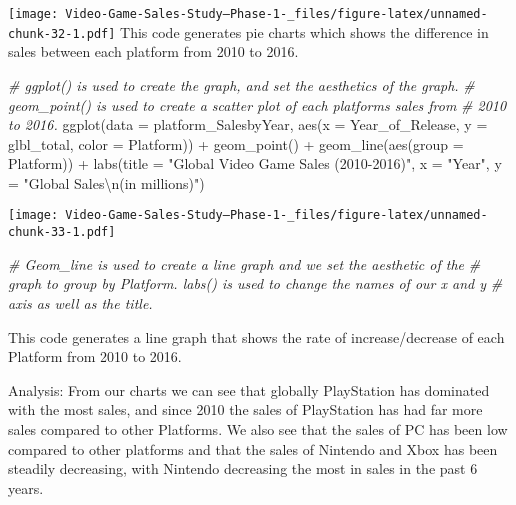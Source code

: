 \documentclass[
]{article}
\newenvironment{Shaded}{\begin{snugshade}}{\end{snugshade}}
\newcommand{\AttributeTok}[1]{\textcolor[rgb]{0.77,0.63,0.00}{#1}}
\newcommand{\CommentTok}[1]{\textcolor[rgb]{0.56,0.35,0.01}{\textit{#1}}}
\newcommand{\FunctionTok}[1]{\textcolor[rgb]{0.00,0.00,0.00}{#1}}
\newcommand{\NormalTok}[1]{#1}
\newcommand{\SpecialCharTok}[1]{\textcolor[rgb]{0.00,0.00,0.00}{#1}}
\newcommand{\StringTok}[1]{\textcolor[rgb]{0.31,0.60,0.02}{#1}}
\begin{document}
\texttt{[image: Video-Game-Sales-Study--Phase-1-\_files/figure-latex/unnamed-chunk-32-1.pdf]}
This code generates pie charts which shows the difference in sales
between each platform from 2010 to 2016.

\begin{Shaded}
\begin{Highlighting}[]
\CommentTok{\# ggplot() is used to create the graph, and set the aesthetics of the graph.}
\CommentTok{\# geom\_point() is used to create a scatter plot of each platforms sales from}
\CommentTok{\# 2010 to 2016.}
\FunctionTok{ggplot}\NormalTok{(}\AttributeTok{data =}\NormalTok{ platform\_SalesbyYear, }\FunctionTok{aes}\NormalTok{(}\AttributeTok{x =}\NormalTok{ Year\_of\_Release, }\AttributeTok{y =}\NormalTok{ glbl\_total, }\AttributeTok{color =}\NormalTok{ Platform)) }\SpecialCharTok{+}
    \FunctionTok{geom\_point}\NormalTok{() }\SpecialCharTok{+} \FunctionTok{geom\_line}\NormalTok{(}\FunctionTok{aes}\NormalTok{(}\AttributeTok{group =}\NormalTok{ Platform)) }\SpecialCharTok{+} \FunctionTok{labs}\NormalTok{(}\AttributeTok{title =} \StringTok{"Global Video Game Sales (2010{-}2016)"}\NormalTok{,}
    \AttributeTok{x =} \StringTok{"Year"}\NormalTok{, }\AttributeTok{y =} \StringTok{"Global Sales}\SpecialCharTok{\textbackslash{}n}\StringTok{(in millions)"}\NormalTok{)}
\end{Highlighting}
\end{Shaded}

\texttt{[image: Video-Game-Sales-Study--Phase-1-\_files/figure-latex/unnamed-chunk-33-1.pdf]}

\begin{Shaded}
\begin{Highlighting}[]
\CommentTok{\# Geom\_line is used to create a line graph and we set the aesthetic of the}
\CommentTok{\# graph to group by Platform. labs() is used to change the names of our x and y}
\CommentTok{\# axis as well as the title.}
\end{Highlighting}
\end{Shaded}

This code generates a line graph that shows the rate of
increase/decrease of each Platform from 2010 to 2016.

Analysis: From our charts we can see that globally PlayStation has
dominated with the most sales, and since 2010 the sales of PlayStation
has had far more sales compared to other Platforms. We also see that the
sales of PC has been low compared to other platforms and that the sales
of Nintendo and Xbox has been steadily decreasing, with Nintendo
decreasing the most in sales in the past 6 years.
\end{document}
